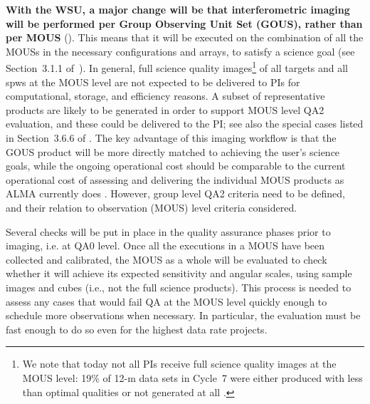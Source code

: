 

\textbf{With the WSU, a major change will be that interferometric imaging will be performed per Group Observing Unit Set (GOUS), rather than per MOUS} (\cite{dp}). This means that it will be executed on the combination of all the MOUSs in the necessary configurations and arrays, to satisfy a science goal (see Section~3.1.1 of~\cite{CSA-IA}). 
In general, full science quality images\footnote{We note that today not all PIs receive full science quality images at the MOUS level: 19\% of 12-m data sets in Cycle~7 were either produced with less than optimal qualities or not generated at all \cite{memo623}.} of all targets and all spws at the MOUS level are not expected to be delivered to PIs for computational, storage, and efficiency reasons. A subset of representative products are likely to be generated in order to support MOUS level QA2 evaluation, and these could be delivered to the PI; see also the special cases listed in Section~3.6.6 of \cite{dp}.
The key advantage of this imaging workflow is that 
the GOUS product will be more directly matched to achieving the user's science goals, while the ongoing operational cost should be comparable to the current operational cost of assessing and delivering the individual MOUS products as ALMA currently does \cite{dp}. However, group level QA2 criteria need to be defined, and their relation to observation (MOUS) level criteria considered.
 
Several checks will be put in place in the quality assurance phases prior to imaging, i.e. at QA0 level.  Once all the executions in a MOUS have been collected and calibrated, the MOUS as a whole will be evaluated to check whether it will achieve its expected sensitivity and angular scales, using sample images and cubes (i.e., not the full science products). This process is needed to assess any cases that would fail QA at the MOUS level quickly enough to schedule more observations when necessary. In particular, the evaluation must be fast enough to do so even for the highest data rate projects. 
 

